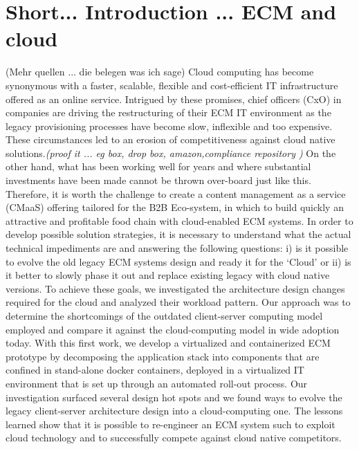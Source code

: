 \documentclass[EPiC]{easychair} %
\begin{document}
\section{Short... Introduction ... ECM and cloud}
\label{sect:introduction}
  (Mehr quellen ... die belegen was ich sage)
  Cloud computing \cite{FehlingLRS2011} has become synonymous with a faster, scalable, flexible and cost-efficient IT infrastructure offered as an online service. Intrigued by these promises, chief officers (CxO) in companies are driving the restructuring of their ECM IT environment as the legacy provisioning processes have become slow, inflexible and too expensive. These circumstances led to an erosion of competitiveness against cloud native solutions.\textit{(proof it ... eg box, drop box, amazon,compliance repository )} On the other hand, what has been working well for years and where substantial investments have been made cannot be thrown over-board just like this. Therefore, it is worth the challenge to create a content management as a service (CMaaS) offering tailored for the B2B Eco-system, in which to build quickly an attractive and profitable food chain with cloud-enabled ECM systems. In order to develop possible solution strategies, it is necessary to understand what the actual technical impediments are and answering the following questions: i) is it possible to evolve the old legacy ECM systems design and ready it for the ‘Cloud’ or ii) is it better to slowly phase it out and replace existing legacy with cloud native versions. To achieve these goals, we investigated the architecture design changes required for the cloud and analyzed their workload pattern. Our approach was to determine the shortcomings of the outdated client-server computing model employed and compare it against the cloud-computing model in wide adoption today.
  With this first work, we develop a virtualized and containerized ECM prototype by decomposing the application stack into components that are confined in stand-alone docker containers, deployed in a virtualized IT environment that is set up through an automated roll-out process. Our investigation surfaced several design hot spots and we found ways to evolve the legacy client-server architecture design into a cloud-computing one. The lessons learned show that it is possible to re-engineer an ECM system such to exploit cloud technology and to successfully compete against cloud native competitors. 
  
\end{document}
